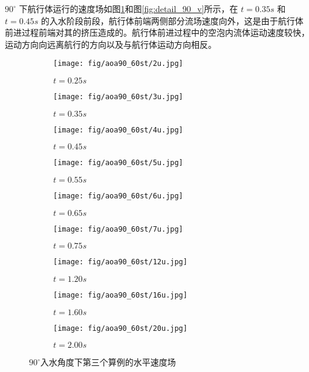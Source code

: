 $90^\circ$ 下航行体运行的速度场如图\ref{fig:detail_90_u}和图\ref{fig:detail_90_v}所示，在 $t = 0.35s$ 和 $t = 0.45s$ 的入水阶段前段，航行体前端两侧部分流场速度向外，这是由于航行体前进过程前端对其的挤压造成的。航行体前进过程中的空泡内流体运动速度较快，运动方向向远离航行的方向以及与航行体运动方向相反。

\begin{figure}[!htp]
  \centering

  \begin{subfigure}{0.25\textwidth}
    \centering
    \texttt{[image: fig/aoa90\_60st/2u.jpg]}
    \caption{$t = 0.25s$}
  \end{subfigure}
  \hspace{1cm}
  \begin{subfigure}{0.25\textwidth}
    \centering
    \texttt{[image: fig/aoa90\_60st/3u.jpg]}
    \caption{$t = 0.35s$}
  \end{subfigure}
  \hspace{1cm}
  \begin{subfigure}{0.25\textwidth}
    \centering
    \texttt{[image: fig/aoa90\_60st/4u.jpg]}
    \caption{$t = 0.45s$}
  \end{subfigure}

  \quad

  \begin{subfigure}{0.25\textwidth}
    \centering
    \texttt{[image: fig/aoa90\_60st/5u.jpg]}
    \caption{$t = 0.55s$}
  \end{subfigure}
  \hspace{1cm}
  \begin{subfigure}{0.25\textwidth}
    \centering
    \texttt{[image: fig/aoa90\_60st/6u.jpg]}
    \caption{$t = 0.65s$}
  \end{subfigure}
  \hspace{1cm}
  \begin{subfigure}{0.25\textwidth}
    \centering
    \texttt{[image: fig/aoa90\_60st/7u.jpg]}
    \caption{$t = 0.75s$}
  \end{subfigure}

  \quad

  \begin{subfigure}{0.25\textwidth}
    \centering
    \texttt{[image: fig/aoa90\_60st/12u.jpg]}
    \caption{$t = 1.20s$}
  \end{subfigure}
  \hspace{1cm}
  \begin{subfigure}{0.25\textwidth}
    \centering
    \texttt{[image: fig/aoa90\_60st/16u.jpg]}
    \caption{$t = 1.60s$}
  \end{subfigure}
  \hspace{1cm}
  \begin{subfigure}{0.25\textwidth}
    \centering
    \texttt{[image: fig/aoa90\_60st/20u.jpg]}
    \caption{$t = 2.00s$}
  \end{subfigure}

  \caption{$90^\circ$入水角度下第三个算例的水平速度场}
  \label{fig:detail_90_u}
\end{figure}

